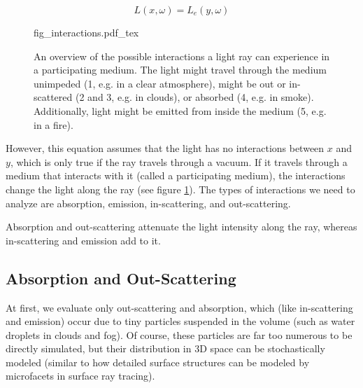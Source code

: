 \begin{equation}\label{eq:no_attenuation}
L({x},\omega ) = L_e({y}, \omega )
\end{equation}

\begin{figure}
\centering
\def\svgwidth{\columnwidth}
{fig_interactions.pdf_tex}

\caption{An overview of the possible interactions a light ray can experience in a participating medium. The light might travel through the medium unimpeded (1, e.g. in a clear atmosphere), might be out or in-scattered (2 and 3, e.g. in clouds), or absorbed (4, e.g. in smoke). Additionally, light might be emitted from inside the medium (5, e.g. in a fire).}
\label{fig:light_interactions}
\end{figure}


However, this equation assumes that the light has no interactions between ${x}$ and ${y}$, which is only true if the ray travels through a vacuum. If it travels through a medium that interacts with it (called a participating medium), the interactions change the light along the ray\cite{10.5555/275458.275468} (see figure \ref{fig:light_interactions}). The types of interactions we need to analyze are absorption, emission, in-scattering, and out-scattering\cite{468400}.

Absorption and out-scattering attenuate the light intensity along the ray, whereas in-scattering and emission add to it.
\subsection{Absorption and Out-Scattering}
At first, we evaluate only out-scattering and absorption, which (like in-scattering and emission) occur due to tiny particles suspended in the volume\cite{10.1145/1179352.1141986} (such as water droplets in clouds and fog).
Of course, these particles are far too numerous to be directly simulated, but their distribution in 3D space can be stochastically modeled\cite{10.1145/1179352.1141986} (similar to how detailed surface structures can be modeled by microfacets \cite{10.1145/965141.563893} in surface ray tracing).

